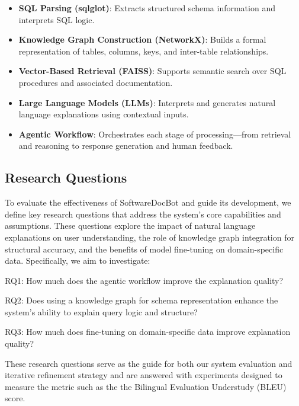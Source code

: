 \documentclass[11pt]{article}
\begin{document}
\begin{itemize}
    \item \textbf{SQL Parsing (sqlglot)}: Extracts structured schema information and interprets SQL logic.
    
    \item \textbf{Knowledge Graph Construction (NetworkX)}: Builds a formal representation of tables, columns, keys, and inter-table relationships.
    
    \item \textbf{Vector-Based Retrieval (FAISS)}: Supports semantic search over SQL procedures and associated documentation.
    
    \item \textbf{Large Language Models (LLMs)}: Interprets and generates natural language explanations using contextual inputs.
    
    \item \textbf{Agentic Workflow}: Orchestrates each stage of processing—from retrieval and reasoning to response generation and human feedback.
\end{itemize}





\subsection{Research Questions}
To evaluate the effectiveness of SoftwareDocBot and guide its development, we define key research questions that address the system’s core capabilities and assumptions. These questions explore the impact of natural language explanations on user understanding, the role of knowledge graph integration for structural accuracy, and the benefits of model fine-tuning on domain-specific data. Specifically, we aim to investigate:

RQ1: How much does the agentic workflow improve the explanation quality?

RQ2: Does using a knowledge graph for schema representation enhance the system’s ability to explain query logic and structure?

RQ3: How much does fine-tuning on domain-specific data improve explanation quality?

These research questions serve as the guide for both our system evaluation and iterative refinement strategy and are answered with experiments designed to measure the metric such as the the Bilingual Evaluation Understudy (BLEU) score.
\end{document}
